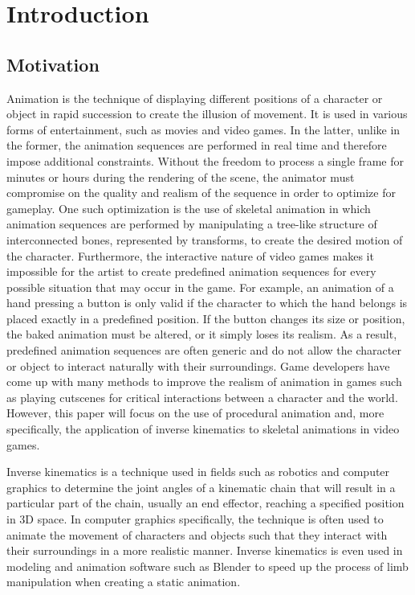 \chapter{Introduction}
\section{Motivation} 
Animation is the technique of displaying different positions of a character or
object in rapid succession to create the illusion of movement. It is used in
various forms of entertainment, such as movies and video games. In the latter,
unlike in the former, the animation sequences are performed in real time and
therefore impose additional constraints. Without the freedom to process a single
frame for minutes or hours during the rendering of the scene, the animator must
compromise on the quality and realism of the sequence in order to optimize for
gameplay. One such optimization is the use of skeletal animation in which
animation sequences are performed by manipulating a tree-like structure of
interconnected bones, represented by transforms, to create the desired motion of
the character. Furthermore, the interactive nature of video games makes it
impossible for the artist to create predefined animation sequences for every
possible situation that may occur in the game. For example, an animation of
a hand pressing a button is only valid if the character to which the hand
belongs is placed exactly in a predefined position. If the button changes its
size or position, the baked animation must be altered, or it simply loses its
realism. As a result, predefined animation sequences are often generic and
do not allow the character or object to interact naturally with their
surroundings. Game developers have come up with many methods to improve the
realism of animation in games such as playing cutscenes for critical
interactions between a character and the world. However, this paper will focus
on the use of procedural animation and, more specifically, the application of
inverse kinematics to skeletal animations in video games.

Inverse kinematics is a technique used in fields such as robotics and computer
graphics to determine the joint angles of a kinematic chain that will result in
a particular part of the chain, usually an end effector, reaching a specified
position in 3D space. In computer graphics specifically, the technique is often
used to animate the movement of characters and objects such that they interact
with their surroundings in a more realistic manner. Inverse kinematics is even
used in modeling and animation software such as Blender \cite{blender_ik2} to
speed up the process of limb manipulation when creating a static animation.

